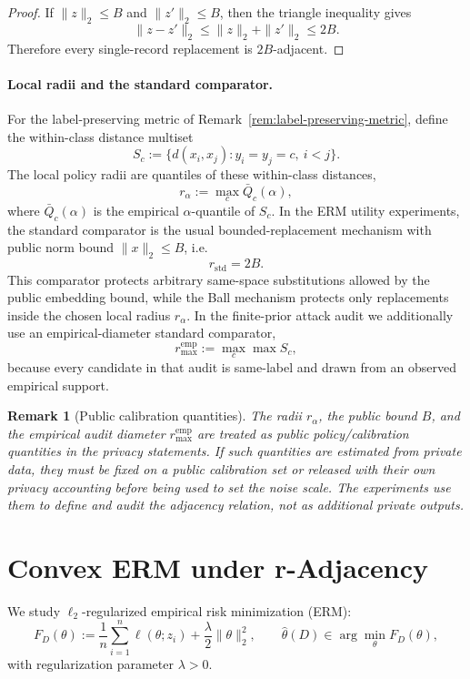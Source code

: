 \documentclass[conference,compsoc]{IEEEtran}
\newtheorem{remark}{Remark}
\begin{document}
\begin{proof}
If $\|z\|_2\le B$ and $\|z'\|_2\le B$, then the triangle inequality gives
\[
\|z-z'\|_2\le \|z\|_2+\|z'\|_2\le 2B.
\]
Therefore every single-record replacement is $2B$-adjacent.
\end{proof}

\paragraph{Local radii and the standard comparator.}
For the label-preserving metric of Remark~\ref{rem:label-preserving-metric}, define the within-class distance multiset
\[
S_c:=\{d(x_i,x_j): y_i=y_j=c,\ i<j\}.
\]
The local policy radii are quantiles of these within-class distances,
\[
r_\alpha:=\max_c \bar Q_c(\alpha),
\]
where $\bar Q_c(\alpha)$ is the empirical $\alpha$-quantile of $S_c$. In the ERM utility experiments, the standard comparator is the usual bounded-replacement mechanism with public norm bound $\|x\|_2\le B$, i.e.
\[
r_{\mathrm{std}}=2B.
\]
This comparator protects arbitrary same-space substitutions allowed by the public embedding bound, while the Ball mechanism protects only replacements inside the chosen local radius $r_\alpha$. In the finite-prior attack audit we additionally use an empirical-diameter standard comparator,
\[
r_{\max}^{\mathrm{emp}}:=\max_c \max S_c,
\]
because every candidate in that audit is same-label and drawn from an observed empirical support.

\begin{remark}[Public calibration quantities]
The radii $r_\alpha$, the public bound $B$, and the empirical audit diameter $r_{\max}^{\mathrm{emp}}$ are treated as public policy/calibration quantities in the privacy statements. If such quantities are estimated from private data, they must be fixed on a public calibration set or released with their own privacy accounting before being used to set the noise scale. The experiments use them to define and audit the adjacency relation, not as additional private outputs.
\end{remark}

\section{Convex ERM under r-Adjacency}
\label{sec:erm}

We study $\ell_2$-regularized empirical risk minimization (ERM):
\[
F_D(\theta):=\frac{1}{n}\sum_{i=1}^n \ell(\theta;z_i)+\frac{\lambda}{2}\|\theta\|_2^2,
\qquad
\hat\theta(D)\in\arg\min_\theta F_D(\theta),
\]
with regularization parameter $\lambda>0$.
\end{document}
